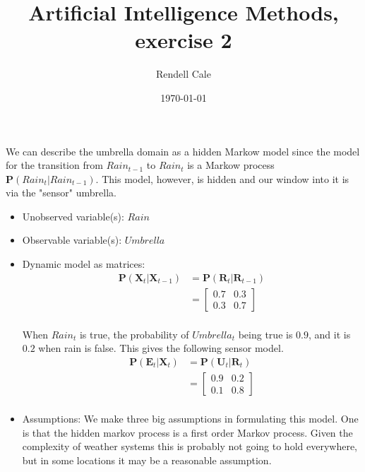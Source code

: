 \documentclass{article}
\title{Artificial Intelligence Methods, exercise 2}
\author{Rendell Cale}
\date{\today}
\begin{document}
\maketitle

\section{}
We can describe the umbrella domain as a hidden Markow model since the  model for the transition from $Rain_{t-1}$ to $Rain_t$ is a Markow process $\mathbf{P}(Rain_t | Rain_{t-1})$. This model, however, is hidden and our window into it is via the "sensor" umbrella. 

\begin{itemize}
    \item Unobserved variable(s): $Rain$
    \item Observable variable(s): $Umbrella$
    \item Dynamic model as matrices:
        \begin{align}
            \mathbf{P}(\mathbf{X}_t | \mathbf{X}_{t-1}) 
                &= \mathbf{P}(\mathbf{R}_t | \mathbf{R}_{t-1}) \\
                &= 
                \begin{bmatrix}
                    0.7 & 0.3 \\
                    0.3 & 0.7
                \end{bmatrix} \\
        \end{align}

        When $Rain_t$ is true, the probability of $Umbrella_t$ being true is $0.9$, and it is $0.2$ when rain is false. This gives the following sensor model. 
        \begin{align}
            \mathbf{P}(\mathbf{E}_t | \mathbf{X}_t) 
                &= \mathbf{P}(\mathbf{U}_t | \mathbf{R}_t ) \\
                &= 
                \begin{bmatrix}
                    0.9 & 0.2 \\
                    0.1 & 0.8 
                \end{bmatrix} \\
        \end{align}
    \item Assumptions: 
        We make three big assumptions in formulating this model. One is that the hidden markov process is a first order Markov process. Given the complexity of weather systems this is probably not going to hold everywhere, but in some locations it may be a reasonable assumption. 


\end{itemize}
\end{document}
